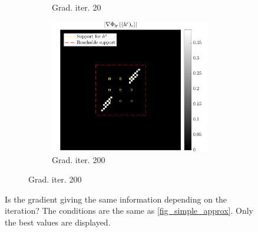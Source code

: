 \begin{figure}[!ht]
\begin{subfigure}[b]{0.49\linewidth}
\begin{subfigure}[b]{0.49\linewidth}
	\caption{Grad. iter. 20}
	\end{subfigure}
	\begin{subfigure}[b]{0.49\linewidth}\centering
	\includegraphics[width=\linewidth]{figures/xp_grad_iterations/xp_128x128_sc2_angl1_K3_S3_node4_iter200_partgrad4_bestvalues.pdf}
	\caption{Grad. iter. 200}
	\end{subfigure}
\end{subfigure}
\caption{Is the gradient giving the same information depending on the iteration? The conditions are the same as \cref{fig_simple_approx}. Only the best values are displayed.}\label{fig_iter_gain_vs_grad}
\end{figure}




